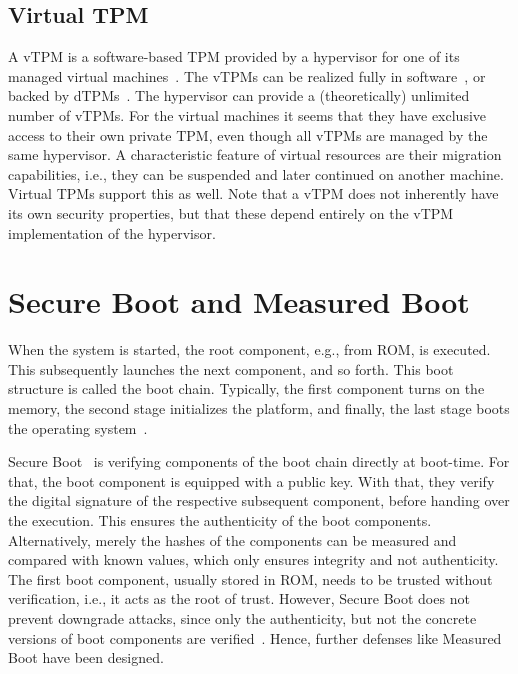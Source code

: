 \subsection{Virtual TPM}

A vTPM is a software-based TPM provided by a hypervisor for one of its managed virtual machines~\cite{268868}.
The vTPMs can be realized fully in software~\cite{268868}, or backed by dTPMs~\cite{Liu2010}.
The hypervisor can provide a (theoretically) unlimited number of vTPMs.
For the virtual machines it seems that they have exclusive access to their own private TPM, even though all vTPMs are managed by the same hypervisor.
A characteristic feature of virtual resources are their migration capabilities, i.e., they can be suspended and later continued on another machine.
Virtual TPMs support this as well.
Note that a vTPM does not inherently have its own security properties, but that these depend entirely on the vTPM implementation of the hypervisor.


\section{Secure Boot and Measured Boot}

When the system is started, the root component, e.g., from ROM, is executed. This subsequently launches the next component, and so forth. This boot structure is called the boot chain. Typically, the first component turns on the memory, the second stage initializes the platform, and finally, the last stage boots the operating system~\cite{Yao2020}.

Secure Boot~\cite{Hendricks2004, UEFI, Frazelle2020} is verifying components of the boot chain directly at boot-time. For that, the boot component is equipped with a public key. With that, they verify the digital signature of the respective subsequent component, before handing over the execution. This ensures the authenticity of the boot components. Alternatively, merely the hashes of the components can be measured and compared with known values, which only ensures integrity and not authenticity. The first boot component, usually stored in ROM, needs to be trusted without verification, i.e., it acts as the root of trust. However, Secure Boot does not prevent downgrade attacks, since only the authenticity, but not the concrete versions of boot components are verified~\cite{272306}. Hence, further defenses like Measured Boot have been designed.



